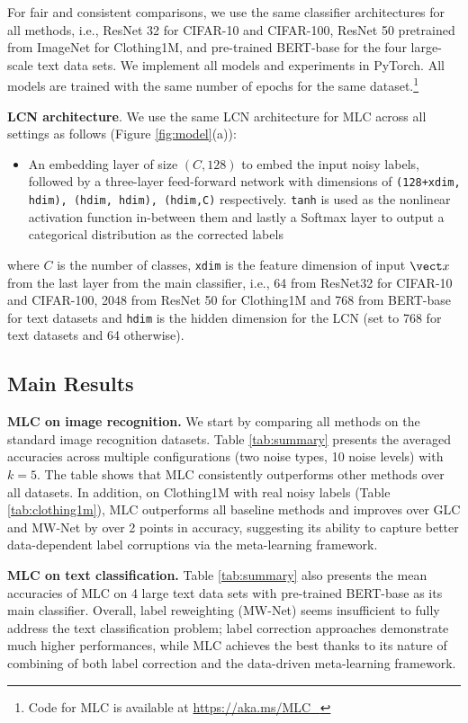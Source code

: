 For fair and consistent comparisons, we use the same classifier
architectures for all methods, i.e., ResNet 32 for CIFAR-10 and
CIFAR-100, ResNet 50 pretrained from ImageNet for Clothing1M, and
pre-trained BERT-base for the four large-scale text data sets. We
implement all models and experiments in PyTorch. All models are
trained with the same number of epochs for the same
dataset.\footnote{Code for MLC is available at \url{https://aka.ms/MLC_}}


\textbf{LCN architecture}. We use the same LCN architecture for MLC
across all settings as follows (Figure \ref{fig:model}(a)):
\begin{itemize}
    \item[] An embedding layer of size $(C, 128)$ to embed the input noisy labels,
    followed by a three-layer feed-forward network with dimensions of \texttt{(128+xdim, hdim), (hdim, hdim), (hdim,C)} respectively. \texttt{tanh} is used as the nonlinear activation function in-between them and lastly a Softmax layer to output a categorical distribution as the corrected labels
\end{itemize}
where $C$ is the number of classes, \texttt{xdim} is the feature dimension of input $\vect x$ from
the last layer from the main classifier, i.e., 64 from ResNet32 for CIFAR-10
and CIFAR-100, 2048 from ResNet 50 for Clothing1M and 768 from
BERT-base for text datasets and \texttt{hdim} is the hidden dimension
for the LCN (set to 768 for text datasets and 64 otherwise).


\subsection{Main Results}


\textbf{MLC on image recognition.} We start by comparing all methods
on the standard image recognition datasets. Table \ref{tab:summary}
presents the averaged accuracies across multiple configurations (two
noise types, 10 noise levels) with $k=5$. The table shows that MLC
consistently outperforms other methods over all datasets.  In
addition, on Clothing1M with real noisy labels (Table
\ref{tab:clothing1m}), MLC outperforms all baseline methods and
improves over GLC and MW-Net by over 2 points in accuracy, suggesting
its ability to capture better data-dependent label corruptions via the
meta-learning framework.

\textbf{MLC on text classification.} Table \ref{tab:summary} also
presents the mean accuracies of MLC on 4 large text data sets with
pre-trained BERT-base as its main classifier. Overall, label reweighting (MW-Net) seems insufficient to fully address the text classification problem; label correction approaches demonstrate much higher performances, while MLC achieves the best thanks to its nature of combining of both label
correction and the data-driven meta-learning framework.

